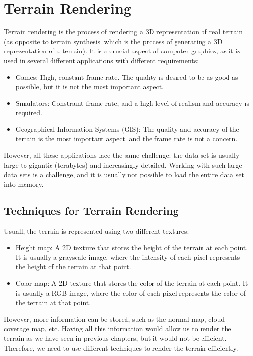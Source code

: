 \chapter{Terrain Rendering}

Terrain rendering is the process of rendering a 3D representation of real terrain (as opposite to terrain synthesis, which is the process of generating a 3D representation of a terrain). It is a crucial aspect of computer graphics, as it is used in several different applications with different requirements:
\begin{itemize}
    \item Games: High, constant frame rate. The quality is desired to be as good as possible, but it is not the most important aspect.
    \item Simulators: Constraint frame rate, and a high level of realism and accuracy is required.
    \item Geographical Information Systems (GIS): The quality and accuracy of the terrain is the most important aspect, and the frame rate is not a concern.
\end{itemize}

However, all these applications face the same challenge: the data set is usually large to gigantic (terabytes) and increasingly detailed. Working with such large data sets is a challenge, and it is usually not possible to load the entire data set into memory.

\section{Techniques for Terrain Rendering}

Usuall, the terrain is represented using two different textures:
\begin{itemize}
    \item Height map: A 2D texture that stores the height of the terrain at each point. It is usually a grayscale image, where the intensity of each pixel represents the height of the terrain at that point.
    \item Color map: A 2D texture that stores the color of the terrain at each point. It is usually a RGB image, where the color of each pixel represents the color of the terrain at that point.
\end{itemize}
However, more information can be stored, such as the normal map, cloud coverage map, etc. Having all this information would allow us to render the terrain as we have seen in previous chapters, but it would not be efficient. Therefore, we need to use different techniques to render the terrain efficiently.

